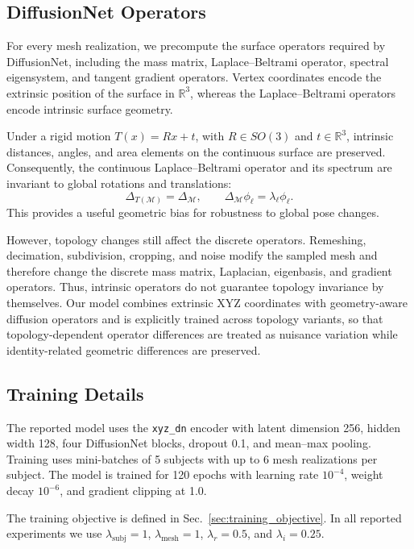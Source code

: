 \documentclass{article}
\begin{document}
\subsection{DiffusionNet Operators}
\label{app:diffusionnet_operators}
For every mesh realization, we precompute the surface operators required by DiffusionNet, including the mass matrix, Laplace--Beltrami operator, spectral eigensystem, and tangent gradient operators. Vertex coordinates encode the extrinsic position of the surface in $\mathbb{R}^3$, whereas the Laplace--Beltrami operators encode intrinsic surface geometry.

Under a rigid motion $T(x)=Rx+t$, with $R\in SO(3)$ and $t\in\mathbb{R}^3$, intrinsic distances, angles, and area elements on the continuous surface are preserved. Consequently, the continuous Laplace--Beltrami operator and its spectrum are invariant to global rotations and translations:
\begin{equation}
\Delta_{T(\mathcal{M})}=\Delta_{\mathcal{M}},
\qquad
\Delta_{\mathcal{M}}\phi_\ell=\lambda_\ell\phi_\ell.
\end{equation}
This provides a useful geometric bias for robustness to global pose changes.

However, topology changes still affect the discrete operators. Remeshing,
decimation, subdivision, cropping, and noise modify the sampled mesh and
therefore change the discrete mass matrix, Laplacian, eigenbasis, and gradient
operators. Thus, intrinsic operators do not guarantee topology invariance by
themselves. Our model combines extrinsic XYZ coordinates with geometry-aware
diffusion operators and is explicitly trained across topology variants, so that
topology-dependent operator differences are treated as nuisance variation while
identity-related geometric differences are preserved.

\subsection{Training Details}
\label{app:training_details}

The reported model uses the \texttt{xyz\_dn} encoder with latent dimension 256,
hidden width 128, four DiffusionNet blocks, dropout 0.1, and mean--max pooling.
Training uses mini-batches of 5 subjects with up to 6 mesh realizations per
subject. The model is trained for 120 epochs with learning rate $10^{-4}$,
weight decay $10^{-6}$, and gradient clipping at 1.0.

The training objective is defined in Sec.~\ref{sec:training_objective}. In all
reported experiments we use $\lambda_{\mathrm{subj}}=1$,
$\lambda_{\mathrm{mesh}}=1$, $\lambda_r=0.5$, and $\lambda_i=0.25$.
\end{document}
